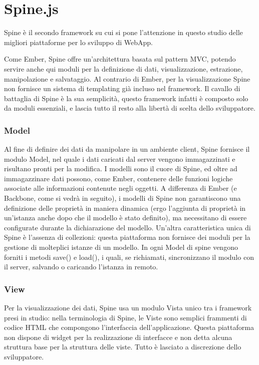
\section{Spine.js} %
\label{sec:spine_js}
Spine è il secondo framework su cui si pone l'attenzione in questo studio delle migliori piattaforme per lo sviluppo di WebApp.

Come Ember, Spine offre un'architettura basata sul pattern MVC, potendo servire anche qui moduli per la definizione di dati, visualizzazione, estrazione, manipolazione e salvataggio. Al contrario di Ember, per la visualizzazione Spine non fornisce un sistema di templating già incluso nel framework. Il cavallo di battaglia di Spine è la sua semplicità, questo framework infatti è composto solo da moduli essenziali, e lascia tutto il resto alla libertà di scelta dello sviluppatore.

\subsubsection{Model} %
\label{ssub:spine_model}

Al fine di definire dei dati da manipolare in un ambiente client, Spine fornisce il modulo Model, nel quale i dati caricati dal server vengono immagazzinati e risultano pronti per la modifica. I modelli sono il cuore di Spine, ed oltre ad immagazzinare dati possono, come Ember, contenere delle funzioni logiche associate alle informazioni contenute negli oggetti.
A differenza di Ember (e Backbone, come si vedrà in seguito), i modelli di Spine non garantiscono una definizione delle proprietà in maniera dinamica (ergo l'aggiunta di proprietà in un'istanza anche dopo che il modello è stato definito), ma necessitano di essere configurate durante la dichiarazione del modello.
Un'altra caratteristica unica di Spine è l'assenza di collezioni: questa piattaforma non fornisce dei moduli per la gestione di molteplici istanze di un modello. In ogni Model di spine vengono forniti i metodi save() e load(), i quali, se richiamati, sincronizzano il modulo con il server, salvando o caricando l'istanza in remoto.
\newpage
\subsubsection{View} %
\label{ssub:spine_view}

Per la visualizzazione dei dati, Spine usa un modulo Vista unico tra i framework presi in studio: nella terminologia di Spine, le Viste sono semplici frammenti di codice HTML che compongono l'interfaccia dell'applicazione. Questa piattaforma non dispone di widget per la realizzazione di interfacce e non detta alcuna struttura base per la struttura delle viste. Tutto è lasciato a discrezione dello sviluppatore.

